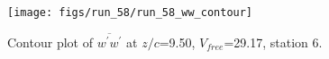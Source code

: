 \begin{figure}[H]
\centering
\texttt{[image: figs/run\_58/run\_58\_ww\_contour]}
\caption{Contour plot of $\overline{w^\prime w^\prime}$ at $z/c$=9.50, $V_{free}$=29.17, station 6.}
\end{figure}


